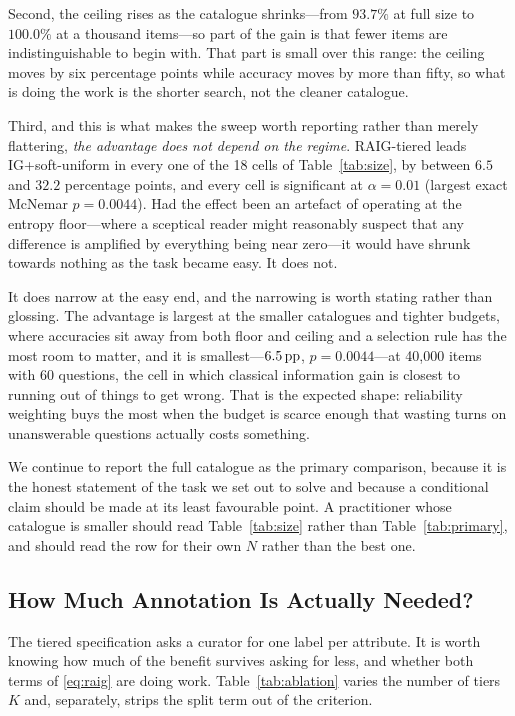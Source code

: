 Second, the ceiling rises as the catalogue shrinks---from $93.7\%$ at full size
to $100.0\%$ at a thousand items---so part of the gain is that fewer items are
indistinguishable to begin with. That part is small over this range: the
ceiling moves by six percentage points while accuracy moves by more than fifty,
so what is doing the work is the shorter search, not the cleaner catalogue.

Third, and this is what makes the sweep worth reporting rather than merely
flattering, \emph{the advantage does not depend on the regime}. RAIG-tiered
leads IG+soft-uniform in every one of the 18 cells of
Table~\ref{tab:size}, by between $6.5$ and $32.2$ percentage
points, and every cell is significant at $\alpha = 0.01$ (largest exact
McNemar $p = 0.0044$). Had the effect been an artefact of operating at the
entropy floor---where a sceptical reader might reasonably suspect that any
difference is amplified by everything being near zero---it would have shrunk
towards nothing as the task became easy. It does not.

It does narrow at the easy end, and the narrowing is worth stating rather than
glossing. The advantage is largest at the smaller catalogues and tighter
budgets, where accuracies sit away from both floor and ceiling and a selection
rule has the most room to matter, and it is smallest---$6.5\,\text{pp}$,
$p = 0.0044$---at 40{,}000 items with
60 questions, the cell in which classical information gain is closest
to running out of things to get wrong. That is the expected shape: reliability
weighting buys the most when the budget is scarce enough that wasting turns on
unanswerable questions actually costs something.

We continue to report the full catalogue as the primary comparison, because it
is the honest statement of the task we set out to solve and because a
conditional claim should be made at its least favourable point. A practitioner
whose catalogue is smaller should read Table~\ref{tab:size} rather than
Table~\ref{tab:primary}, and should read the row for their own $N$ rather
than the best one.

\subsection{How Much Annotation Is Actually Needed?}
\label{sec:results-ablation}

The tiered specification asks a curator for one label per attribute. It is
worth knowing how much of the benefit survives asking for less, and whether
both terms of \eqref{eq:raig} are doing work. Table~\ref{tab:ablation} varies
the number of tiers $K$ and, separately, strips the split term out of the
criterion.

